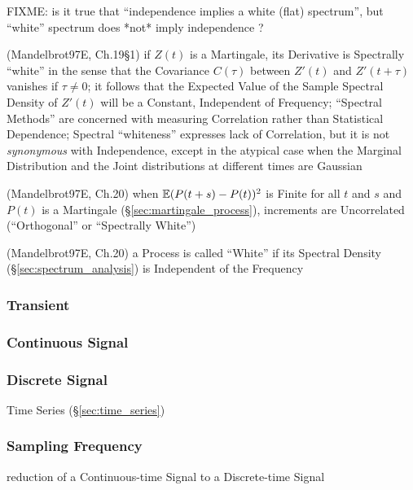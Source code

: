 FIXME: is it true that ``independence implies a white (flat) spectrum'',
but ``white'' spectrum does *not* imply independence ?

(Mandelbrot97E, Ch.19\S 1) if $Z(t)$ is a Martingale, its Derivative is
Spectrally ``white'' in the sense that the Covariance $C(\tau)$ between $Z'(t)$
and $Z'(t + \tau)$ vanishes if $\tau \neq 0$; it follows that the Expected Value
of the Sample Spectral Density of $Z'(t)$ will be a Constant, Independent of
Frequency; ``Spectral Methods'' are concerned with measuring Correlation rather
than Statistical Dependence; Spectral ``whiteness'' expresses lack of
Correlation, but it is not \emph{synonymous} with Independence, except in the
atypical case when the Marginal Distribution and the Joint distributions at
different times are Gaussian

(Mandelbrot97E, Ch.20) when $\mathbb{E}(P(t+s) - P(t))^2$ is Finite for all $t$ and
$s$ and $P(t)$ is a Martingale (\S\ref{sec:martingale_process}), increments are
Uncorrelated (``Orthogonal'' or ``Spectrally White'')

(Mandelbrot97E, Ch.20) a Process is called ``White'' if its Spectral Density
(\S\ref{sec:spectrum_analysis}) is Independent of the Frequency



\subsubsection{Transient}\label{sec:transient}

\subsubsection{Continuous Signal}\label{sec:continuous_signal}

\subsubsection{Discrete Signal}\label{sec:discrete_signal}

\fist Time Series (\S\ref{sec:time_series})



\subsubsection{Sampling Frequency}\label{sec:sampling_frequency}

reduction of a Continuous-time Signal to a Discrete-time Signal

